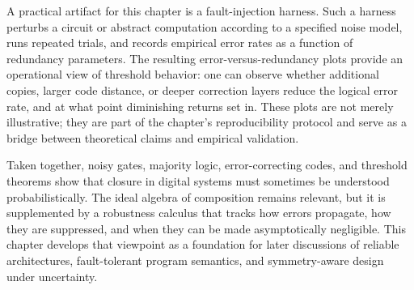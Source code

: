 A practical artifact for this chapter is a fault-injection harness. Such a harness perturbs a circuit or abstract computation according to a specified noise model, runs repeated trials, and records empirical error rates as a function of redundancy parameters. The resulting error-versus-redundancy plots provide an operational view of threshold behavior: one can observe whether additional copies, larger code distance, or deeper correction layers reduce the logical error rate, and at what point diminishing returns set in. These plots are not merely illustrative; they are part of the chapter's reproducibility protocol and serve as a bridge between theoretical claims and empirical validation.

Taken together, noisy gates, majority logic, error-correcting codes, and threshold theorems show that closure in digital systems must sometimes be understood probabilistically. The ideal algebra of composition remains relevant, but it is supplemented by a robustness calculus that tracks how errors propagate, how they are suppressed, and when they can be made asymptotically negligible. This chapter develops that viewpoint as a foundation for later discussions of reliable architectures, fault-tolerant program semantics, and symmetry-aware design under uncertainty.

